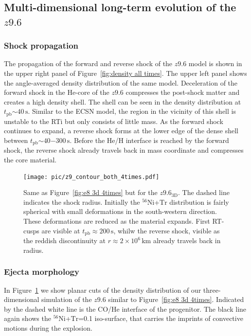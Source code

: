 \documentclass[fleqn,usenatbib]{mnras}
\newcommand{\tpb}{\ensuremath{t_{\text{pb}}}}
\newcommand{\nickel}{\ensuremath{\mathrm{^{56}Ni}}\xspace}
\newcommand{\tracer}{\ensuremath{\mathrm{Tr}}\xspace}
\newcommand{\s}{\ensuremath{\text{s}}}
\begin{document}
\subsection{Multi-dimensional long-term evolution of the $z9.6$}
\label{sec:Multidimensional long term evolution of the z9.6}
\subsubsection{Shock propagation}
The propagation of the forward and reverse shock of the $z9.6$ model is shown in the upper right panel of Figure~\ref{fig:density all times}. The upper left panel shows the angle-averaged density distribution of the same model.
Deceleration of the forward shock in the He-core of the $z9.6$ compresses the post-shock matter and creates a high density shell. The shell can be seen in the density distribution at $\tpb\mathord{\sim}40\,\s$. Similar to the ECSN model, the region in the vicinity of this shell is unstable to the RTi but only consists of little mass.
As the forward shock continues to expand, a reverse shock forms at the lower edge of the dense shell between $\tpb\mathord{\sim}40\mathord{-}300\,\s$. 
Before the He/H interface is reached by the forward shock, the reverse shock already travels back in mass coordinate and compresses the core material. 
\begin{figure}
 \centering
 \texttt{[image: pic/z9\_contour\_both\_4times.pdf]}
 \caption{Same as Figure~\ref{fig:e8 3d 4times} but for the $z9.6_{\mathrm{3D}}$. The dashed line indicates the shock radius. Initially the \nickel+\tracer distribution is fairly spherical with small deformations in the south-western direction. These deformations are reduced as the material expands. First RT-cusps are visible at $t_{\mathrm{pb}}\approx 200\,\text{s}$, whilw the reverse shock, visible as the reddish discontinuity at $r\approx 2\times 10^{6}\,\mathrm{km}$ already travels back in radius.}
 \label{fig:z9 3d 4times}
\end{figure}

\subsubsection{Ejecta morphology}
In Figure~\ref{fig:z9 3d 4times} we show planar cuts of the density distribution of our three-dimensional simulation of the $z9.6$ similar to Figure~\ref{fig:e8 3d 4times}. Indicated by the dashed white line is the CO/He interface of the progenitor. The black line again shows the \nickel+\tracer=0.1 iso-surface, that carries the imprints of convective motions during the explosion.
\end{document}
